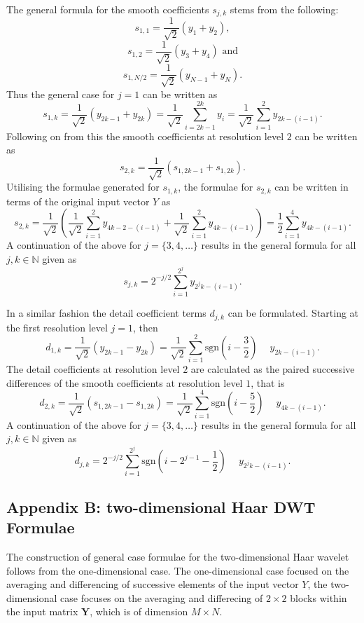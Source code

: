 \documentclass[a4paper, 12pt]{article}
\begin{document}
\noindent
The general formula for the smooth coefficients $s_{j,k}$ stems from the following:
$$s_{1,1} = \frac{1}{\sqrt{2}}(y_{1} + y_{2}),$$
$$s_{1,2} = \frac{1}{\sqrt{2}}(y_{3} + y_{4}) \text{ and}$$
$$s_{1,N/2} = \frac{1}{\sqrt{2}}(y_{N-1} + y_{N}).$$
Thus the general case for $j=1$ can be written as
$$s_{1,k} = \frac{1}{\sqrt{2}}(y_{2k-1} + y_{2k}) = \frac{1}{\sqrt{2}} \sum\limits^{2k}_{i = 2k - 1} y_{i} = \frac{1}{\sqrt{2}} \sum\limits^{2}_{i = 1} y_{2k - (i - 1)}.$$
Following on from this the smooth coefficients at resolution level $2$ can be written as
$$s_{2,k} = \frac{1}{\sqrt{2}} (s_{1, 2k - 1} + s_{1, 2k}).$$
Utilising the formulae generated for $s_{1, k}$, the formulae for $s_{2,k}$ can be written in terms of the original input vector $Y$ as
$$s_{2,k} = \frac{1}{\sqrt{2}} \left(\frac{1}{\sqrt{2}} \sum\limits^{2}_{i = 1} y_{4k - 2 - (i - 1)} + \frac{1}{\sqrt{2}} \sum\limits^{2}_{i = 1} y_{4k - (i - 1)} \right) = \frac{1}{2} \sum\limits^{4}_{i = 1} y_{4k - (i - 1)}.$$
A continuation of the above for $j = \{3, 4, \ldots \}$ results in the general formula for all $j, k \in \mathbb{N}$ given as
$$s_{j,k} = 2^{-j/2} \sum\limits^{2^{j}}_{i=1} y_{2^{j}k- (i-1)}.$$

\noindent
In a similar fashion the detail coefficient terms $d_{j,k}$ can be formulated. Starting at the first resolution level $j = 1$, then
$$d_{1,k} = \frac{1}{\sqrt{2}} (y_{2k-1} - y_{2k}) = \frac{1}{\sqrt{2}} \sum\limits^{2}_{i = 1} \mathrm{sgn}\left(i - \frac{3}{2}\right) \phantom{-} y_{2k - (i - 1)}.$$
The detail coefficients at resolution level $2$ are calculated as the paired successive differences of the smooth coefficients at resolution level $1$, that is
$$d_{2,k} = \frac{1}{\sqrt{2}} (s_{1, 2k-1} - s_{1, 2k}) = \frac{1}{\sqrt{2}} \sum\limits^{4}_{i = 1} \mathrm{sgn}\left(i - \frac{5}{2}\right) \phantom{-} y_{4k - (i - 1)}.$$
A continuation of the above for $j = \{3, 4, \ldots \}$ results in the general formula for all $j, k \in \mathbb{N}$ given as
$$d_{j,k} = 2^{-j/2} \sum\limits^{2^{j}}_{i=1} \mathrm{sgn}\left(i - 2^{j-1} - \frac{1}{2}\right) \phantom{-} y_{2^{j}k- (i-1)}.$$

\newpage
{}
\subsection*{Appendix B: two-dimensional Haar DWT Formulae}\label{App:DWT2d}
The construction of general case formulae for the two-dimensional Haar wavelet follows from the one-dimensional case. The one-dimensional case focused on the averaging and differencing of successive elements of the input vector $Y$, the two-dimensional case focuses on the averaging and differecing of $2 \times 2$ blocks within the input matrix $\mathbf{Y}$, which is of dimension $M \times N$.
\end{document}
